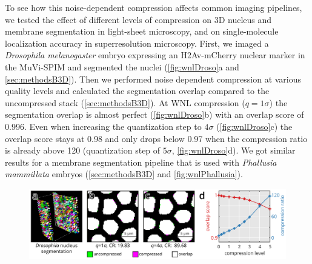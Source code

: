     To see how this noise-dependent compression affects common imaging pipelines, we tested the effect of different levels of compression on 3D nucleus and membrane segmentation in light-sheet microscopy, and on single-molecule localization accuracy in superresolution microscopy. First, we imaged a \textit{Drosophila melanogaster} embryo expressing an H2Av-mCherry nuclear marker in the MuVi-SPIM and segmented the nuclei (\autoref{fig:wnlDroso}a and \autoref{sec:methodsB3D}). Then we performed noise dependent compression at various quality levels and calculated the segmentation overlap compared to the uncompressed stack (\autoref{sec:methodsB3D}). At WNL compression ($q=1 \sigma$) the segmentation overlap is almost perfect (\autoref{fig:wnlDroso}b) with an overlap score of 0.996. Even when increasing the quantization step to $4\sigma$ (\autoref{fig:wnlDroso}c) the overlap score stays at 0.98 and only drops below 0.97 when the compression ratio is already above 120 (quantization step of $5\sigma$, \autoref{fig:wnlDroso}d). We got similar results for a membrane segmentation pipeline that is used with \textit{Phallusia mammillata} embryos (\autoref{sec:methodsB3D} and \autoref{fig:wnlPhallusia}).

    \begin{figure}[tpb]
      \centering
      \includegraphics[page=1,width=1\textwidth]{LLvsB3D}
      \label{fig:wnlDroso}
    \end{figure}

